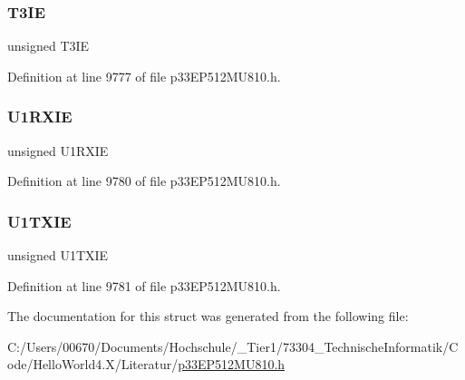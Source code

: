 \subsubsection{\texorpdfstring{T3\+IE}{T3IE}}
{\footnotesize\ttfamily unsigned T3\+IE}



Definition at line 9777 of file p33\+E\+P512\+M\+U810.\+h.

\mbox{\label{structtag_i_e_c0_b_i_t_s_a58c780e10d0e091bf7ae7015cfb2df61}} 
\subsubsection{\texorpdfstring{U1\+R\+X\+IE}{U1RXIE}}
{\footnotesize\ttfamily unsigned U1\+R\+X\+IE}



Definition at line 9780 of file p33\+E\+P512\+M\+U810.\+h.

\mbox{\label{structtag_i_e_c0_b_i_t_s_a1793c03968c989df28da7e323b14c4e9}} 
\subsubsection{\texorpdfstring{U1\+T\+X\+IE}{U1TXIE}}
{\footnotesize\ttfamily unsigned U1\+T\+X\+IE}



Definition at line 9781 of file p33\+E\+P512\+M\+U810.\+h.



The documentation for this struct was generated from the following file\+:\begin{DoxyCompactItemize}
\item 
C\+:/\+Users/00670/\+Documents/\+Hochschule/\+\_\+\+Tier1/73304\+\_\+\+Technische\+Informatik/\+Code/\+Hello\+World4.\+X/\+Literatur/\hyperlink{p33_e_p512_m_u810_8h}{p33\+E\+P512\+M\+U810.\+h}\end{DoxyCompactItemize}
